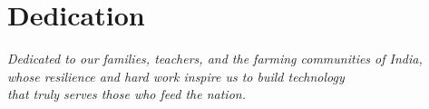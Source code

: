\chapter*{Dedication}

\vspace{2cm}
\begin{center}
\textit{Dedicated to our families, teachers, and the farming communities of India,}\\[0.4cm]
\textit{whose resilience and hard work inspire us to build technology}\\[0.4cm]
\textit{that truly serves those who feed the nation.}
\end{center}
